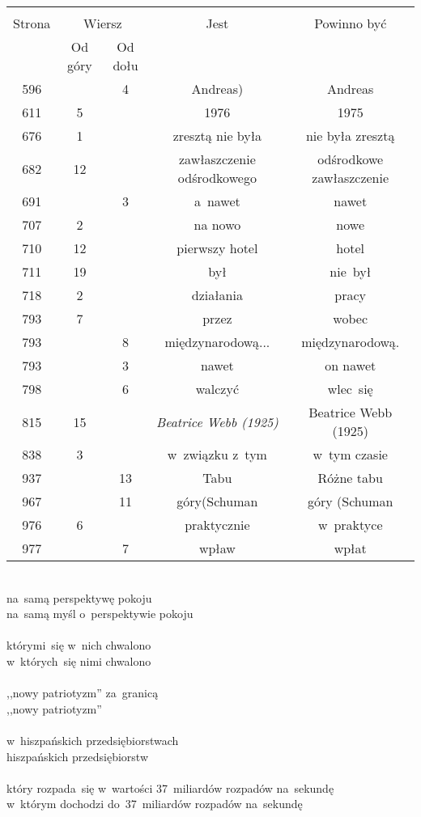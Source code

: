\documentclass[a4paper,11pt]{article}
\begin{document}
\begin{center}
  \begin{tabular}{|c|c|c|c|c|}
    \hline
    & \multicolumn{2}{c|}{} & & \\
    Strona & \multicolumn{2}{c|}{Wiersz} & Jest
                              & Powinno być \\ \cline{2-3}
    & Od góry & Od dołu & & \\
    \hline
    596 & &  4 & Andreas) & Andreas \\
    611 &  5 & & 1976 & 1975 \\
    676 &  1 & & zresztą nie była & nie była zresztą \\
    682 & 12 & & zawłaszczenie odśrodkowego & odśrodkowe zawłaszczenie \\
    691 & &  3 & a~nawet & nawet \\
    707 &  2 & & na nowo & nowe \\
    710 & 12 & & pierwszy hotel & hotel \\
    711 & 19 & & był & nie~był \\
    718 &  2 & & działania & pracy \\
    793 &  7 & & przez & wobec \\
    793 & &  8 & międzynarodową... & międzynarodową. \\
    793 & &  3 & nawet & on nawet \\
    798 & &  6 & walczyć & wlec~się \\
    815 & 15 & & \emph{Beatrice Webb (1925)} & Beatrice Webb (1925) \\
    838 &  3 & & w~związku z~tym & w~tym czasie \\
    937 & & 13 & Tabu & Różne tabu \\
    967 & & 11 & góry(Schuman & góry (Schuman \\
    976 &  6 & & praktycznie & w~praktyce \\
    977 & &  7 & wpław & wpłat \\
    \hline
  \end{tabular}
\end{center}
\noi
{} \\
\Jest na~samą perspektywę pokoju \\
\Pow  na~samą myśl o~perspektywie pokoju \\
 \\
\Jest którymi~się w~nich chwalono \\
\Pow  w~których~się nimi chwalono \\
 \\
\Jest ,,nowy patriotyzm'' za~granicą \\
\Pow  ,,nowy patriotyzm'' \\
 \\
\Jest w~hiszpańskich przedsiębiorstwach \\
\Pow  hiszpańskich przedsiębiorstw \\
 \\
\Jest który rozpada~się w~wartości 37~miliardów rozpadów na~sekundę \\
\Pow  w~którym dochodzi do~37~miliardów rozpadów na~sekundę \\
\end{document}
